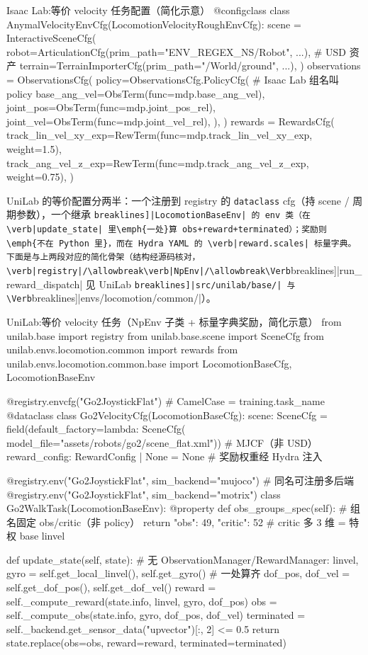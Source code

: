 \begin{codebox}[Python]{Isaac Lab:等价 velocity 任务配置（简化示意）}
@configclass
class AnymalVelocityEnvCfg(LocomotionVelocityRoughEnvCfg):
    scene = InteractiveSceneCfg(
        robot=ArticulationCfg(prim_path="{ENV_REGEX_NS}/Robot", ...),  # USD 资产
        terrain=TerrainImporterCfg(prim_path="/World/ground", ...),
    )
    observations = ObservationsCfg(
        policy=ObservationsCfg.PolicyCfg(                  # Isaac Lab 组名叫 policy
            base_ang_vel=ObsTerm(func=mdp.base_ang_vel),
            joint_pos=ObsTerm(func=mdp.joint_pos_rel),
            joint_vel=ObsTerm(func=mdp.joint_vel_rel),
        ),
    )
    rewards = RewardsCfg(
        track_lin_vel_xy_exp=RewTerm(func=mdp.track_lin_vel_xy_exp, weight=1.5),
        track_ang_vel_z_exp=RewTerm(func=mdp.track_ang_vel_z_exp, weight=0.75),
    )
\end{codebox}

UniLab 的等价配置分两半：一个注册到 registry 的 \verb|dataclass| cfg（持 scene / 周期参数），一个继承 \Verb[breaklines]|LocomotionBaseEnv| 的 env 类（在 \verb|update_state| 里\emph{一处}算 obs+reward+terminated）；奖励则\emph{不在 Python 里}，而在 Hydra YAML 的 \verb|reward.scales| 标量字典。下面是与上两段对应的简化骨架（结构经源码核对，\verb|registry|/\allowbreak\verb|NpEnv|/\allowbreak\Verb[breaklines]|run_reward_dispatch| 见 UniLab \Verb[breaklines]|src/unilab/base/| 与 \Verb[breaklines]|envs/locomotion/common/|）。

\begin{codebox}[Python]{UniLab:等价 velocity 任务（NpEnv 子类 + 标量字典奖励，简化示意）}
from unilab.base import registry
from unilab.base.scene import SceneCfg
from unilab.envs.locomotion.common import rewards
from unilab.envs.locomotion.common.base import LocomotionBaseCfg, LocomotionBaseEnv

@registry.envcfg("Go2JoystickFlat")               # CamelCase = training.task_name
@dataclass
class Go2VelocityCfg(LocomotionBaseCfg):
    scene: SceneCfg = field(default_factory=lambda: SceneCfg(
        model_file="assets/robots/go2/scene_flat.xml"))   # MJCF（非 USD）
    reward_config: RewardConfig | None = None     # 奖励权重经 Hydra 注入

@registry.env("Go2JoystickFlat", sim_backend="mujoco")    # 同名可注册多后端
@registry.env("Go2JoystickFlat", sim_backend="motrix")
class Go2WalkTask(LocomotionBaseEnv):
    @property
    def obs_groups_spec(self):                    # 组名固定 obs/critic（非 policy）
        return {"obs": 49, "critic": 52}          # critic 多 3 维 = 特权 base linvel

    def update_state(self, state):                # 无 ObservationManager/RewardManager:
        linvel, gyro = self.get_local_linvel(), self.get_gyro()   # 一处算齐
        dof_pos, dof_vel = self.get_dof_pos(), self.get_dof_vel()
        reward = self._compute_reward(state.info, linvel, gyro, dof_pos)
        obs = self._compute_obs(state.info, gyro, dof_pos, dof_vel)
        terminated = self._backend.get_sensor_data("upvector")[:, 2] <= 0.5
        return state.replace(obs=obs, reward=reward, terminated=terminated)
\end{codebox}

